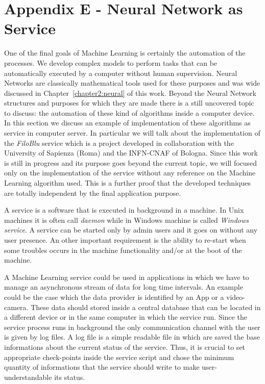 \documentclass{standalone}
\begin{document}
\chapter*{Appendix E - Neural Network as Service}

One of the final goals of Machine Learning is certainly the automation of the processes.
We develop complex models to perform tasks that can be automatically executed by a computer without human supervision.
Neural Networks are classically mathematical tools used for these purposes and was wide discussed in Chapter~\ref{chapter2:neural} of this work.
Beyond the Neural Network structures and purposes for which they are made there is a still uncovered topic to discuss: the automation of these kind of algorithms inside a computer device.
In this section we discuss an example of implementation of these algorithms as service in computer server.
In particular we will talk about the implementation of the \emph{FiloBlu} service which is a project developed in collaboration with the University of Sapienza (Roma) and the INFN-CNAF of Bologna.
Since this work is still in progress and its purpose goes beyond the current topic, we will focused only on the implementation of the service without any reference on the Machine Learning algorithm used.
This is a further proof that the developed techniques are totally independent by the final application purpose.

A service is a software that is executed in background in a machine.
In Unix machines it is often call \emph{daemon} while in Windows machine is called \emph{Windows service}.
A service can be started only by admin users and it goes on without any user presence.
An other important requirement is the ability to re-start when some troubles occurs in the machine functionality and/or at the boot of the machine.

A Machine Learning service could be used in applications in which we have to manage an asynchronous stream of data for long time intervals.
An example could be the case which the data provider is identified by an App or a video-camera.
These data should stored inside a central database that can be located in a different device or in the same computer in which the service run.
Since the service process runs in background the only communication channel with the user is given by log files.
A log file is a simple readable file in which are saved the base informations about the current status of the service.
Thus, it is crucial to set appropriate check-points inside the service script and chose the minimum quantity of informations that the service should write to make user-understandable its status.
\end{document}
